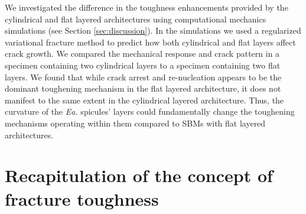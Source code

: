 \documentclass[12pt,onecolumn]{article}
\makeatletter
\newcommand{\EA}{\textit{Ea.\@}\xspace}
\makeatother
\begin{document}
\begin{bibunit}
We investigated the difference in the toughness enhancements provided by the cylindrical and flat layered architectures using computational mechanics simulations (see Section \ref{sec:discussion}). In the simulations we used a regularized variational fracture method \cite{bourdin2000numerical} to predict how both cylindrical and flat layers affect crack growth. We compared the mechanical response and crack pattern in a specimen containing two cylindrical layers to a specimen containing two flat layers. We found that while crack arrest and re-nucleation appears to be the dominant toughening mechanism in the flat layered architecture, it does not manifest to the same extent in the cylindrical layered architecture. Thus, the curvature of the \EA spicules' layers could fundamentally change the toughening mechanisms operating within them compared to SBMs with flat layered architectures.

\section{Recapitulation of the concept of fracture toughness}
\label{sec:tdef}


\end{bibunit}
\end{document}
